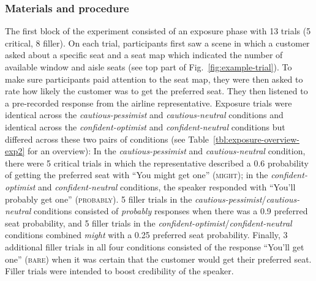 \documentclass[man,floatsintext]{apa6}
\begin{document}
\subsubsection{Materials and procedure}

The first block of the experiment consisted of an exposure phase with 13 trials (5 critical, 8 filler). On each trial, participants first saw a scene in which a customer asked about a specific seat and a seat map which indicated the number of available window and aisle seats (see top part of Fig.~\ref{fig:example-trial}). To make sure participants paid attention to the seat map, they were then asked to rate how likely the customer  was to get the preferred seat. They then listened to a pre-recorded response from the airline representative. Exposure trials were identical across the \textit{cautious-pessimist} and \textit{cautious-neutral} conditions and identical across the \textit{confident-optimist} and \textit{confident-neutral} conditions but differed across these two pairs of conditions (see Table~\ref{tbl:exposure-overview-exp2} for an overview): In the \textit{cautious-pessimist} and \textit{cautious-neutral} condition, there were 5 critical trials in which the representative described a 0.6 probability of getting the preferred seat with ``You might get one'' (\textsc{might}); in the \textit{confident-optimist} and \textit{confident-neutral} conditions, the speaker responded with ``You'll probably get one'' (\textsc{probably}). 5 filler trials in the \textit{cautious-pessimist}/\textit{cautious-neutral} conditions consisted of \textit{probably} responses   when there was a 0.9 preferred seat probability, and 5 filler trials in the \textit{confident-optimist}/\textit{confident-neutral} conditions combined \textit{might} with a 0.25 preferred seat  probability. Finally, 3 additional filler trials in all four conditions consisted of the response ``You'll get one'' (\textsc{bare}) when it was certain that the customer would get their preferred seat. Filler trials were intended to boost credibility of the speaker.
\end{document}
